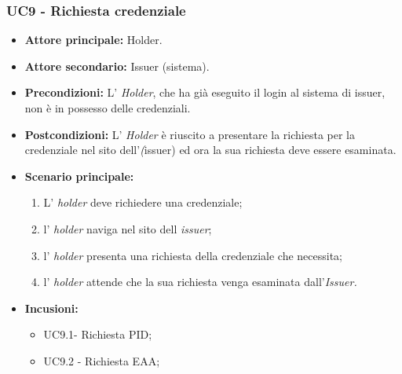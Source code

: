 \subsubsection{UC9 - Richiesta credenziale}
\begin{itemize}
\item \textbf{Attore principale:} Holder.
\item \textbf{Attore secondario:} Issuer (sistema). 
\item \textbf{Precondizioni:} L’ \textit{Holder}, che ha già eseguito il login al sistema di issuer, non è in possesso delle credenziali.
\item \textbf{Postcondizioni:} L’ \textit{Holder} è riuscito a presentare la richiesta per la credenziale nel sito dell'\textit(issuer) ed ora la sua richiesta deve essere esaminata.
\item \textbf{Scenario principale:} 
    \begin{enumerate}
        \item L' \textit{holder} deve richiedere una credenziale; 
        \item l' \textit{holder} naviga nel sito dell \textit{issuer};
        \item l' \textit{holder} presenta una richiesta della credenziale che necessita;
        \item l' \textit{holder} attende che la sua richiesta venga esaminata dall'\textit{Issuer.}
    \end{enumerate}
\item \textbf{Incusioni:}
    \begin{itemize}
    \item UC9.1- Richiesta PID;
    \item UC9.2 - Richiesta EAA;
    \end{itemize}
\end{itemize}

